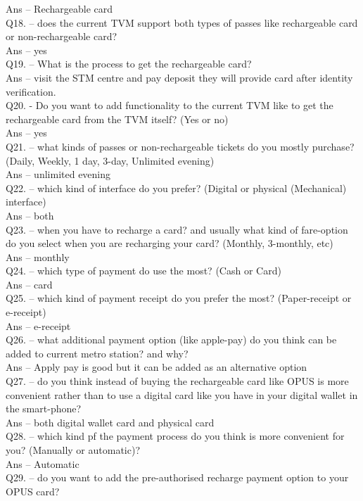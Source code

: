\documentclass[a4paper, 11pt]{report}
\begin{document}
Ans – Rechargeable card\\
Q18. – does the current TVM support both types of passes like rechargeable card or non-rechargeable card? \\
Ans – yes\\
Q19. – What is the process to get the rechargeable card? \\
Ans – visit the STM centre and pay deposit they will provide card after identity verification. \\
Q20. -  Do you want to add functionality to the current TVM like to get the rechargeable card from the TVM itself? (Yes or no) \\
Ans – yes\\
Q21. – what kinds of passes or non-rechargeable tickets do you mostly purchase? (Daily, Weekly, 1 day, 3-day, Unlimited evening) \\
Ans – unlimited evening\\
Q22. – which kind of interface do you prefer? (Digital or physical (Mechanical) interface) \\
Ans – both\\
Q23. – when you have to recharge a card? and usually what kind of fare-option do you select when you are recharging your card? (Monthly, 3-monthly, etc) \\
Ans – monthly\\
Q24. – which type of payment do use the most? (Cash or Card) \\
Ans – card\\
Q25. – which kind of payment receipt do you prefer the most? (Paper-receipt or e-receipt) \\
Ans – e-receipt\\
Q26. – what additional payment option (like apple-pay) do you think can be added to current metro station? and why? \\
Ans – Apply pay is good but it can be added as an alternative option \\
Q27. – do you think instead of buying the rechargeable card like OPUS is more convenient rather than to use a digital card like you have in your digital wallet in the smart-phone? \\
Ans – both digital wallet card and physical card\\
Q28. – which kind pf the payment process do you think is more convenient for you? (Manually or automatic)? \\
Ans – Automatic\\
Q29. – do you want to add the pre-authorised recharge payment option to your OPUS card? \\
\end{document}
